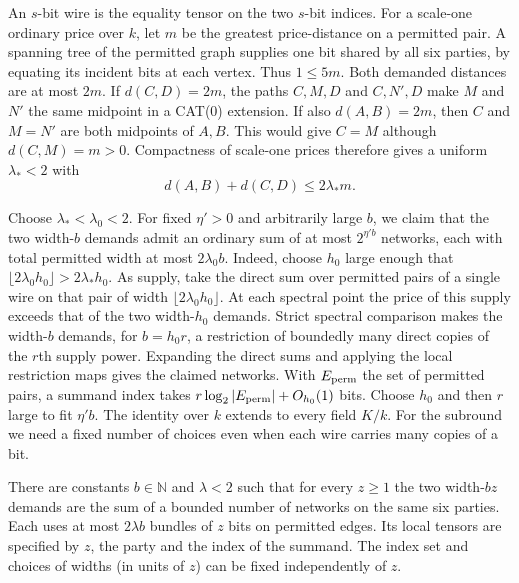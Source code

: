 An \(s\)-bit wire is the equality tensor on the two \(s\)-bit indices.
For a scale-one ordinary price over \(k\), let \(m\) be the greatest
price-distance on a permitted pair. A spanning tree of the permitted
graph supplies one bit shared by all six parties, by equating its
incident bits at each vertex. Thus \(1\le5m\). Both demanded distances
are at most \(2m\). If \(d(C,D)=2m\), the paths \(C,M,D\) and \(C,N',D\)
make \(M\) and \(N'\) the same midpoint in a CAT(0) extension. If also
\(d(A,B)=2m\), then \(C\) and \(M=N'\) are both midpoints of \(A,B\).
This would give \(C=M\) although \(d(C,M)=m>0\). Compactness of
scale-one prices therefore gives a uniform \(\lambda_*<2\) with
\[
 d(A,B)+d(C,D)\le2\lambda_*m .
\]

Choose \(\lambda_*<\lambda_0<2\). For fixed \(\eta'>0\) and arbitrarily
large \(b\), we claim that the two width-\(b\) demands admit an ordinary
sum of at most \(2^{\eta'b}\) networks, each with total permitted width
at most \(2\lambda_0b\). Indeed, choose \(h_0\) large enough that
\(\lfloor2\lambda_0h_0\rfloor>2\lambda_*h_0\). As supply, take the
direct sum over permitted pairs of a single wire on that pair of width
\(\lfloor2\lambda_0h_0\rfloor\). At each spectral point the price of
this supply exceeds that of the two width-\(h_0\) demands. Strict
spectral comparison makes the width-\(b\) demands, for \(b=h_0r\),
a restriction of boundedly many direct copies of the \(r\)th supply power.
Expanding the direct sums and applying the local restriction maps gives
the claimed networks. With \(E_{\rm perm}\) the set of permitted pairs,
a summand index takes \(r\log_2|E_{\rm perm}|+O_{h_0}(1)\) bits.
Choose \(h_0\) and then \(r\) large to fit \(\eta'b\). The identity
over \(k\) extends to every field \(K/k\). For the subround we need a
fixed number of choices even when each wire carries many copies of a bit.

\begin{lemma}\label{lem:powered-gadget}
There are constants $b\in\mathbb N$ and $\lambda<2$ such that for
every $z\ge1$ the two width-$bz$ demands are the sum of a bounded
number of networks on the same six parties. Each uses at most
$2\lambda b$ bundles of $z$ bits on permitted edges. Its local
tensors are specified by $z$, the party and the index of the summand.
The index set and choices of widths (in units of $z$) can be fixed independently of $z$.
\end{lemma}

